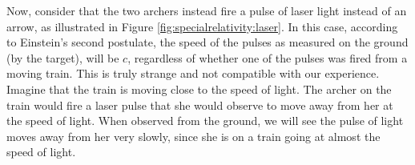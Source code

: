 Now, consider that the two archers instead fire a pulse of laser light instead of an arrow, as illustrated in Figure \ref{fig:specialrelativity:laser}. 
In this case, according to Einstein's second postulate, the speed of the pulses as measured on the ground (by the target), will be $c$, regardless of whether one of the pulses was fired from a moving train. This is truly strange and not compatible with our experience. Imagine that the train is moving close to the speed of light. The archer on the train would fire a laser pulse that she would observe to move away from her at the speed of light. When observed from the ground, we will see the pulse of light moves away from her very slowly, since she is on a train going at almost the speed of light. 

